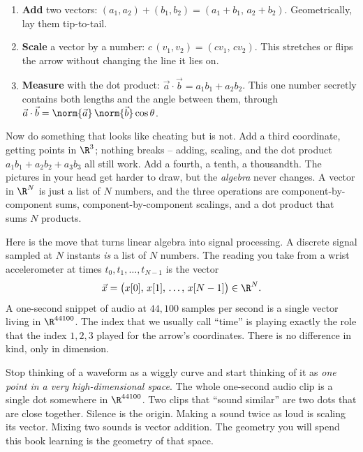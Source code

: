 \begin{enumerate}
  \item \textbf{Add} two vectors: $(a_1,a_2) + (b_1,b_2) = (a_1+b_1,\, a_2+b_2)$. Geometrically,
    lay them tip-to-tail.
  \item \textbf{Scale} a vector by a number: $c\,(v_1,v_2) = (c v_1,\, c v_2)$. This stretches or
    flips the arrow without changing the line it lies on.
  \item \textbf{Measure} with the dot product: $\vec{a}\cdot\vec{b} = a_1 b_1 + a_2 b_2$. This one
    number secretly contains both lengths and the angle between them, through
    $\vec{a}\cdot\vec{b} = \norm{\vec{a}}\,\norm{\vec{b}}\cos\theta$.
\end{enumerate}

Now do something that looks like cheating but is not. Add a third coordinate, getting points in
$\R^3$; nothing breaks -- adding, scaling, and the dot product $a_1b_1+a_2b_2+a_3b_3$ all still
work. Add a fourth, a tenth, a thousandth. The pictures in your head get harder to draw, but the
\emph{algebra} never changes. A vector in $\R^N$ is just a list of $N$ numbers, and the three
operations are component-by-component sums, component-by-component scalings, and a dot product that
sums $N$ products.

Here is the move that turns linear algebra into signal processing. A discrete signal sampled at
$N$ instants \emph{is} a list of $N$ numbers. The reading you take from a wrist accelerometer at
times $t_0, t_1, \dots, t_{N-1}$ is the vector
\[
  \vec{x} = \big(x[0],\, x[1],\, \dots,\, x[N-1]\big) \in \R^N .
\]
A one-second snippet of audio at $44{,}100$ samples per second is a single vector living in
$\R^{44100}$. The index that we usually call ``time'' is playing exactly the role that the index
$1,2,3$ played for the arrow's coordinates. There is no difference in kind, only in dimension.

\begin{intuitionbox}
Stop thinking of a waveform as a wiggly curve and start thinking of it as \emph{one point in a very
high-dimensional space}. The whole one-second audio clip is a single dot somewhere in $\R^{44100}$.
Two clips that ``sound similar'' are two dots that are close together. Silence is the origin. Making
a sound twice as loud is scaling its vector. Mixing two sounds is vector addition. The geometry you
will spend this book learning is the geometry of that space.
\end{intuitionbox}


